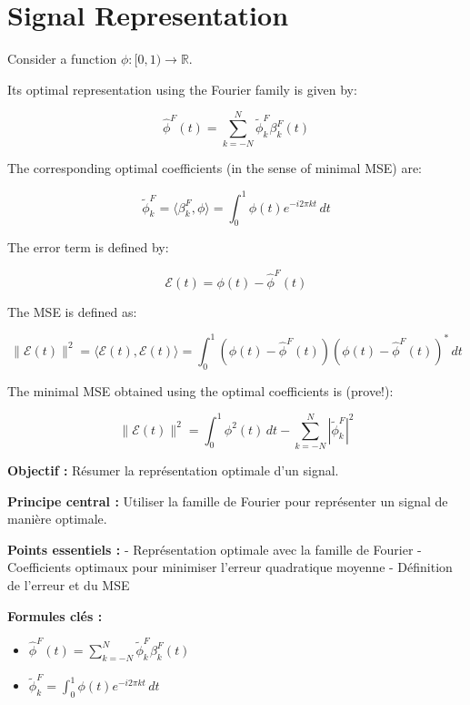 \documentclass[12pt]{article}
\begin{document}
\newpage

\section{Signal Representation}

Consider a function \( \phi : [0,1) \rightarrow \mathbb{R} \).

Its optimal representation using the Fourier family is given by:

\[
\hat{\phi}^F(t) = \sum_{k=-N}^{N} \tilde{\phi}_k^F \beta_k^F(t)
\]

The corresponding optimal coefficients (in the sense of minimal MSE) are:

\[
\tilde{\phi}_k^F = \langle \beta_k^F, \phi \rangle = \int_0^1 \phi(t) e^{-i2\pi kt} \, dt
\]

The error term is defined by:

\[
\mathcal{E}(t) = \phi(t) - \hat{\phi}^F(t)
\]

The MSE is defined as:

\[
\|\mathcal{E}(t)\|^2 = \langle \mathcal{E}(t), \mathcal{E}(t) \rangle = \int_0^1 \left( \phi(t) - \hat{\phi}^F(t) \right) \left( \phi(t) - \hat{\phi}^F(t) \right)^* \, dt
\]

The minimal MSE obtained using the optimal coefficients is (prove!):

\[
\|\mathcal{E}(t)\|^2 = \int_0^1 \phi^2(t) \, dt - \sum_{k=-N}^{N} |\tilde{\phi}_k^F|^2
\]

\begin{tcolorbox}[colback=red!5!white, colframe=red!75!black, title={\faBookmark\hspace{0.5em}Fiche Récapitulative}]
  
\textbf{Objectif :} Résumer la représentation optimale d'un signal.

\textbf{Principe central :} Utiliser la famille de Fourier pour représenter un signal de manière optimale.

\vspace{0.4em}
\textbf{Points essentiels :}  
- Représentation optimale avec la famille de Fourier
- Coefficients optimaux pour minimiser l'erreur quadratique moyenne
- Définition de l'erreur et du MSE

\vspace{0.4em}
\textbf{Formules clés :}  
\begin{itemize}
\item \(\hat{\phi}^F(t) = \sum_{k=-N}^{N} \tilde{\phi}_k^F \beta_k^F(t)\)
\item \(\tilde{\phi}_k^F = \int_0^1 \phi(t) e^{-i2\pi kt} \, dt\)
\end{itemize}
  
\end{tcolorbox}
\end{document}
